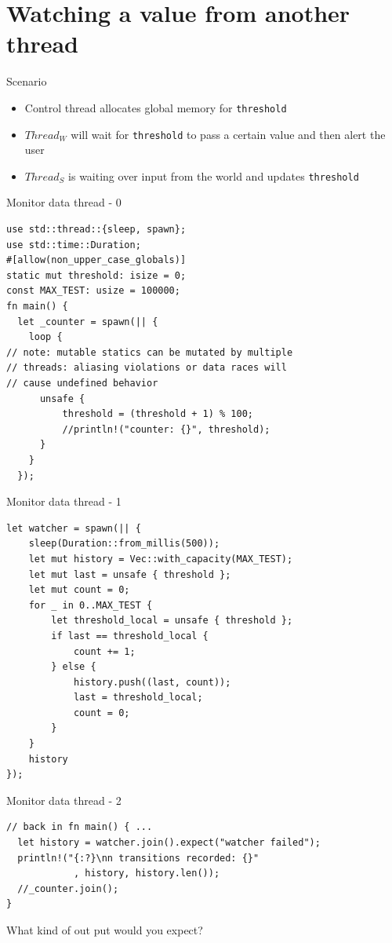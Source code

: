 \documentclass[10pt,aspectratio=169]{beamer}
\begin{document}
\section{Watching a value from another thread}

\begin{frame}{Scenario}
    \begin{itemize}
        \item Control thread allocates global memory for \texttt{threshold}
        \item $Thread_W$ will wait for \texttt{threshold} to pass a certain value and then alert the user
        \item $Thread_S$ is waiting over input from the world and updates \texttt{threshold}
    \end{itemize}
\end{frame}

\begin{frame}[fragile]{Monitor data thread - 0}
\begin{verbatim}
use std::thread::{sleep, spawn};
use std::time::Duration;
#[allow(non_upper_case_globals)]
static mut threshold: isize = 0;
const MAX_TEST: usize = 100000;
fn main() {
  let _counter = spawn(|| {
    loop {
// note: mutable statics can be mutated by multiple 
// threads: aliasing violations or data races will 
// cause undefined behavior
      unsafe {
          threshold = (threshold + 1) % 100;
          //println!("counter: {}", threshold);
      }
    }
  });
\end{verbatim}
\end{frame}

\begin{frame}[fragile]{Monitor data thread - 1}
\begin{verbatim}
let watcher = spawn(|| {
    sleep(Duration::from_millis(500));
    let mut history = Vec::with_capacity(MAX_TEST);
    let mut last = unsafe { threshold };
    let mut count = 0;
    for _ in 0..MAX_TEST {
        let threshold_local = unsafe { threshold };
        if last == threshold_local {
            count += 1;
        } else {
            history.push((last, count));
            last = threshold_local;
            count = 0;
        }
    }
    history
});

\end{verbatim}
\end{frame}

\begin{frame}[fragile]{Monitor data thread - 2}
\begin{verbatim}
// back in fn main() { ...
  let history = watcher.join().expect("watcher failed");
  println!("{:?}\nn transitions recorded: {}"
            , history, history.len());
  //_counter.join();
}
\end{verbatim}
What kind of out put would you \alert{expect}?

\end{frame}
\end{document}
